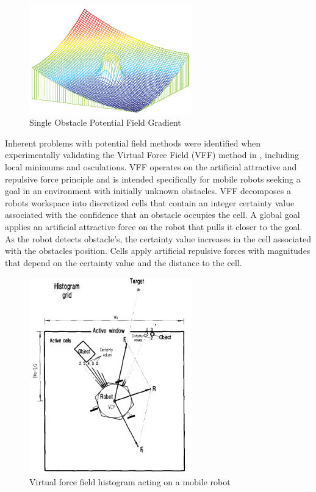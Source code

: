\documentclass[numbered,pdftex]{ohio-etd}
\begin{document}
\begin{figure}[h!]
	\centering
	\includegraphics[width=7cm]{PaperFigures/pfObstacle}
	\caption{Single Obstacle Potential Field Gradient \cite{liu_virtual-waypoint_2016}}
	\label{fig:pfobstacle}
\end{figure}


Inherent problems with potential field methods were identified when experimentally validating the Virtual Force Field (VFF) method in \cite{koren_potential_1991}, including local minimums and osculations. VFF operates on the artificial  attractive and repulsive force principle and is intended specifically for mobile robots seeking a goal in an environment with initially unknown obstacles. VFF decomposes a robots workspace into discretized cells that contain an integer certainty value associated with the confidence that an obstacle occupies the cell. A global goal applies an artificial attractive force on the robot that pulls it closer to the goal. As the robot detects obstacle's, the certainty value increases in the cell associated with the obstacles position. Cells apply artificial repulsive forces with magnitudes that depend on the certainty value and the distance to the cell.


\begin{figure}[H]
	\centering
	\includegraphics[width=7cm]{PaperFigures/histogram}
	\caption{Virtual force field histogram acting on a mobile robot \cite{borenstein_vector_1991}}
	\label{fig:histogram}
\end{figure}
\end{document}
